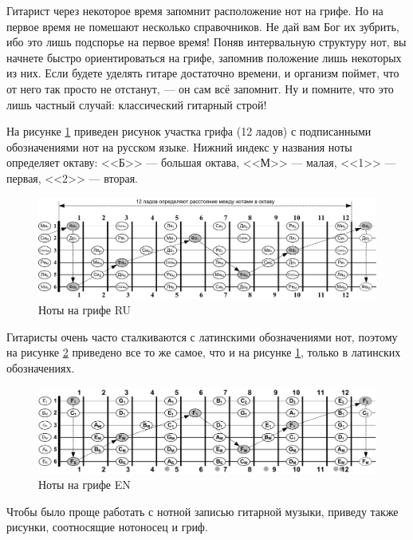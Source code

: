 Гитарист через некоторое время запомнит расположение нот на грифе. Но на первое время не помешают несколько справочников. Не дай вам Бог их зубрить, ибо это лишь подспорье на первое время! Поняв интервальную структуру нот, вы начнете быстро ориентироваться на грифе, запомнив положение лишь некоторых из них. Если будете уделять гитаре достаточно времени, и организм поймет, что от него так просто не отстанут, --- он сам всё запомнит. Ну и помните, что это лишь частный случай: классический гитарный строй!

На рисунке \ref{fig:guitar:notes-on-griph-ru} приведен рисунок участка грифа (12 ладов) с подписанными обозначениями нот на русском языке. Нижний индекс у названия ноты определяет октаву: <<Б>> --- большая октава, <<М>> --- малая, <<1>> --- первая, <<2>> --- вторая.

\begin{figure}[!ht]
    \centering
    \includegraphics[width=\textwidth]{fig/notes-on-griph-ru} 
    \caption{Ноты на грифе RU}\label{fig:guitar:notes-on-griph-ru}
\end{figure} 

Гитаристы очень часто сталкиваются с латинскими обозначениями нот, поэтому на рисунке \ref{fig:guitar:notes-on-griph-lat} приведено все то же самое, что и на рисунке \ref{fig:guitar:notes-on-griph-ru}, только в латинских обозначениях.

\begin{figure}[!ht]
    \centering
    \includegraphics[width=\textwidth]{fig/notes-on-griph-lat} 
    \caption{Ноты на грифе EN}\label{fig:guitar:notes-on-griph-lat}
\end{figure} 

Чтобы было проще работать с нотной записью гитарной музыки, приведу также рисунки, соотносящие нотоносец и гриф.


